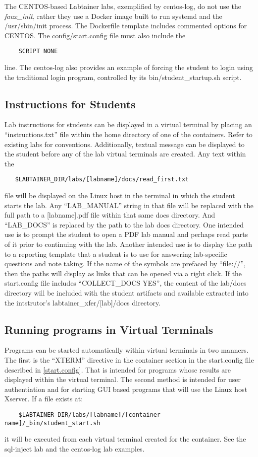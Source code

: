 \documentclass[12pt]{article}
\begin{document}
The CENTOS-based Labtainer labs, exemplified by centos-log, do not use the \textit{faux\_init}, rather they
use a Docker image built to run systemd and the /usr/sbin/init process.  The Dockerfile template includes
commented options for CENTOS.  The config/start.config file must also include the 
\begin{verbatim}
    SCRIPT NONE
\end{verbatim}
\noindent line.  The centos-log also provides an example of forcing the student to login using the traditional
login program, controlled by its bin/student\_startup.sh script.   


\subsection {Instructions for Students} \label{instructions}
Lab instructions for students can be displayed in a virtual terminal by placing an
``instructions.txt'' file within the home directory of one of the containers.  Refer to existing
labs for conventions.  Additionally, textual message can be displayed to the student before any 
of the lab virtual terminals are created.  Any text within the 
\begin{verbatim}
   $LABTAINER_DIR/labs/[labname]/docs/read_first.txt
\end{verbatim}
\noindent file will be displayed on the Linux host in the terminal in which the student
starts the lab.  Any ``LAB\_MANUAL'' string in that file will be replaced with the full path
to a [labname].pdf file within that same docs directory.  And ``LAB\_DOCS'' is replaced by the
path to the lab docs directory.  One intended use is to prompt the
student to open a PDF lab manual and perhaps read parts of it prior to continuing with the lab.
Another intended use is to display the path to a reporting template that a student is to use
for answering lab-specific questions and note taking.  If the name of the symbols are prefaced
by ``file://'', then the paths will display as links that can be opened via a right click.
If the start.config file includes ``COLLECT\_DOCS YES'', the content of the lab/docs directory will be
included with the student artifacts and available extracted into the intstrutor's 
labtainer\_xfer/[lab]/docs directory.

\subsection {Running programs in Virtual Terminals}
Programs can be started automatically within virtual terminals in two manners.
The first is the ``XTERM'' directive in the container section in the start.config file
described in \ref{start.config}.  That is intended for programs whose results are displayed
within the virtual terminal.  The second method is intended for user authentiation and
for starting GUI based programs
that will use the Linux host Xserver.  If a file exists at:
\begin{verbatim}
    $LABTAINER_DIR/labs/[labname]/[container name]/_bin/student_start.sh
\end{verbatim}
it will be executed from each virtual terminal created for the container.
See the sql-inject lab and the centos-log lab examples.
\end{document}
